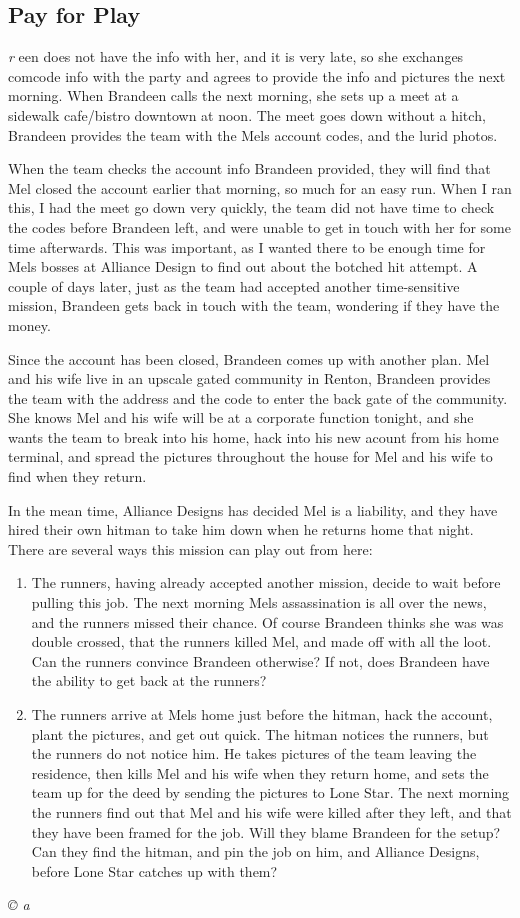 \documentclass[letterpaper,onecolumn,10pt]{article}
\renewcommand{\textsc}[1]{{\fontspec{Friz Quadrata SC TT}\selectfont #1}}
\newcommand{\getyear}[1]{\StrLeft{#1}{4}}
\newenvironment{scenario}[6]
	{
		\section[#1 {\small\textsc{[#2]}}]{#1} \nopagebreak

		\noindent{\textsc{#2}}\nopagebreak

		\noindent\textit{#3}\nopagebreak
		\def\TMPSCENARIO{{\small\textit{©\getyear{#5}{} #4}}}
	}
	{\TMPSCENARIO}
\begin{document}
\begin{multicols}{2}
\begin{scenario}{Pay for Play}
Brandeen does not have the info with her, and it is very late, so she exchanges comcode info with the party and agrees to provide the info and pictures the next morning. When Brandeen calls the next morning, she sets up a meet at a sidewalk cafe/bistro downtown at noon. The meet goes down without a hitch, Brandeen provides the team with the Mels account codes, and the lurid photos.

When the team checks the account info Brandeen provided, they will find that Mel closed the account earlier that morning, so much for an easy run. When I ran this, I had the meet go down very quickly, the team did not have time to check the codes before Brandeen left, and were unable to get in touch with her for some time afterwards. This was important, as I wanted there to be enough time for Mels bosses at Alliance Design to find out about the botched hit attempt. A couple of days later, just as the team had accepted another time-sensitive mission, Brandeen gets back in touch with the team, wondering if they have the money.

Since the account has been closed, Brandeen comes up with another plan. Mel and his wife live in an upscale gated community in Renton, Brandeen provides the team with the address and the code to enter the back gate of the community. She knows Mel and his wife will be at a corporate function tonight, and she wants the team to break into his home, hack into his new acount from his home terminal, and spread the pictures throughout the house for Mel and his wife to find when they return.

In the mean time, Alliance Designs has decided Mel is a liability, and they have hired their own hitman to take him down when he returns home that night. There are several ways this mission can play out from here:

\begin{enumerate}

\item The runners, having already accepted another mission, decide to wait before pulling this job. The next morning Mels assassination is all over the news, and the runners missed their chance. Of course Brandeen thinks she was was double crossed, that the runners killed Mel, and made off with all the loot. Can the runners convince Brandeen otherwise? If not, does Brandeen have the ability to get back at the runners?

\item The runners arrive at Mels home just before the hitman, hack the account, plant the pictures, and get out quick. The hitman notices the runners, but the runners do not notice him. He takes pictures of the team leaving the residence, then kills Mel and his wife when they return home, and sets the team up for the deed by sending the pictures to Lone Star. The next morning the runners find out that Mel and his wife were killed after they left, and that they have been framed for the job. Will they blame Brandeen for the setup? Can they find the hitman, and pin the job on him, and Alliance Designs, before Lone Star catches up with them?


\end{enumerate}
\end{scenario}
\end{multicols}
\end{document}
